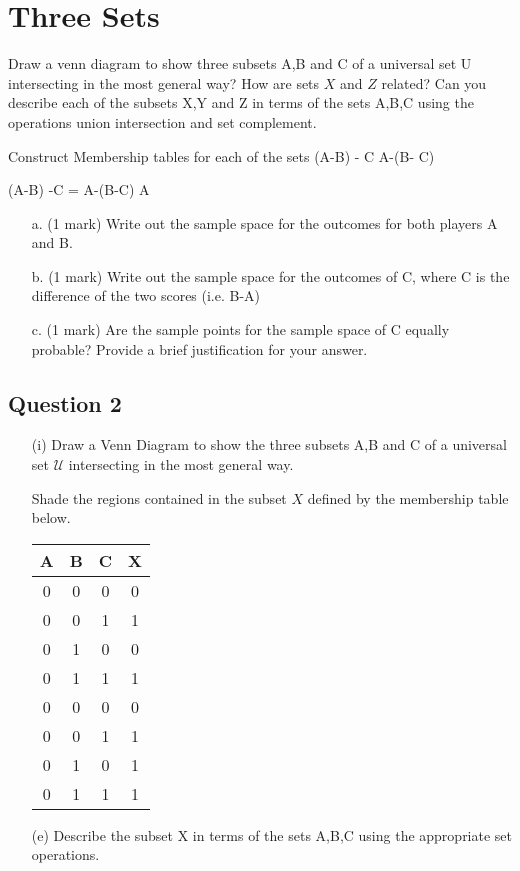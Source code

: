 \documentclass[11pt,a4paper,titlepage,oneside,openany]{article}
\numberwithin{equation}{section}
\numberwithin{algorithm}{section}
\numberwithin{figure}{section}
\numberwithin{table}{section}
\begin{document}
\section{Three Sets}
Draw a venn diagram to show three subsets A,B and C of a universal set U intersecting in the most general way?
How are sets $X$ and $Z$ related?
Can you describe each of the subsets X,Y and Z in terms  of the
sets A,B,C using the operations union intersection and set complement.

Construct Membership tables for each of the sets
(A-B) - C
A-(B- C)

(A-B) -C = A-(B-C)
A



\begin{itemize}
\item[a.] (1 mark) Write out the sample space for the outcomes for both players A and B.
\item[b.] (1 mark) Write out the sample space for the outcomes of C, where C is the difference of the two scores (i.e. B-A)
\item[c.] (1 mark) Are the sample points for the sample space of C equally probable? Provide a brief justification for your answer.
\end{itemize}




\subsection*{Question 2}
\begin{itemize}

\item[(i)] Draw a Venn Diagram to show the three subsets A,B and C of a universal set $\mathcal{U}$
intersecting in the most general way.

Shade the regions contained in the subset $X$ defined
by the membership table below.  
\begin{center}
\begin{tabular}{|ccc|c|}
  \hline
  A & B & C & X \\\hline
  0 & 0 & 0 & 0 \\
  0 & 0 & 1 & 1 \\
  0 & 1 & 0 & 0 \\
  0 & 1 & 1 & 1 \\
  0 & 0 & 0 & 0 \\
  0 & 0 & 1 & 1 \\
  0 & 1 & 0 & 1 \\
  0 & 1 & 1 & 1 \\
  \hline
\end{tabular}
\end{center}
\item[(e)] Describe the subset X in terms of the sets A,B,C using the appropriate set operations. \newline [2 Marks]
\end{itemize}
\end{document}
